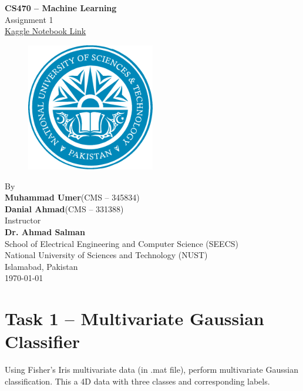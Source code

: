 \documentclass[11pt,a4paper]{article}
\begin{document}
\newpage
\begin{titlepage}
  \vspace*{\fill} %
  \centering
  \huge{\textbf{CS470 -- Machine Learning}} \\
  \huge{Assignment 1} \\ 
  \LARGE{
    \href{
      https://www.kaggle.com/code/muhammadumer2002/multivariate-ml}{Kaggle Notebook Link}} \\ [0.75cm]
  \begin{figure}[ht!]
    \centering
    \includegraphics[width=0.5\textwidth]{figs/nust.pdf}
  \end{figure}
  \vspace {0.75cm}
  \Large{By} \\
  \Large{\textbf{Muhammad Umer}\quad(CMS -- 345834)} \\
  \Large{\textbf{Danial Ahmad}\quad(CMS -- 331388)} \\[0.75cm]
  \Large{Instructor} \\
  \Large{\textbf{Dr. Ahmad Salman}} \\[0.75cm]
  \Large{School of Electrical Engineering and Computer Science (SEECS) \\
    National University of Sciences and Technology (NUST) \\
    Islamabad, Pakistan} \\ [0.75 cm]
  \Large{\today}
  \vspace*{\fill} %
\end{titlepage}


\setcounter{page}{1}
\thispagestyle{firstpage}

\section{Task 1 -- Multivariate Gaussian Classifier}
Using Fisher's Iris multivariate data (in .mat file), perform multivariate Gaussian classification. This a 4D data with three classes and corresponding labels.
\end{document}
